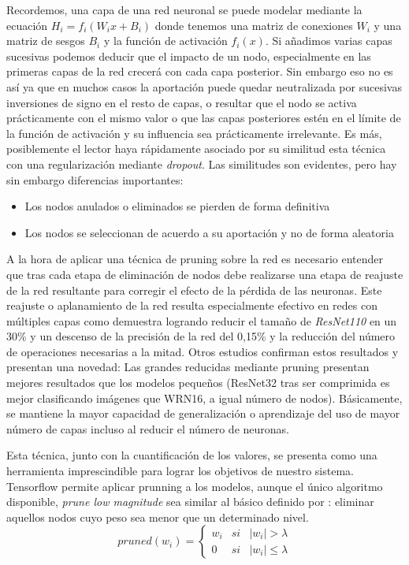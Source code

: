 Recordemos, una capa de una red neuronal se puede modelar mediante la ecuación $H_i = f_i(W_ix+B_i)$ donde tenemos una matriz de conexiones $W_{i}$ y una matriz de sesgos $B_{i}$ y la función de activación $f_i(x)$. Si añadimos varias capas sucesivas podemos deducir que el impacto de un nodo, especialmente en las primeras capas de la red crecerá con cada capa posterior. Sin embargo eso no es así ya que en muchos casos la aportación puede quedar neutralizada por sucesivas inversiones de signo en el resto de capas, o resultar que el nodo se activa prácticamente con el mismo valor o que las capas posteriores estén en el límite de la función de activación y su influencia sea prácticamente irrelevante\cite{Mozer1989}. Es más, posiblemente el lector haya rápidamente asociado por su similitud esta técnica con una regularización mediante \textit{dropout}. Las similitudes son evidentes, pero hay sin embargo diferencias importantes:
\begin{itemize}
  \item Los nodos anulados o eliminados se pierden de forma definitiva
  \item Los nodos se seleccionan de acuerdo a su aportación y no de forma aleatoria
\end{itemize}

A la hora de aplicar una técnica de pruning sobre la red es necesario entender que tras cada etapa de eliminación de nodos debe realizarse una etapa de reajuste de la red resultante para corregir el efecto de la pérdida de las neuronas. Este reajuste o aplanamiento de la red resulta especialmente efectivo en redes con múltiples capas como demuestra  logrando reducir el tamaño de \textit{ResNet110} en un 30\% y un descenso de la precisión de la red del 0,15\% y la reducción del número de operaciones necesarias a la mitad. Otros estudios\cite{Lee2019,Bartoldson2019,Han2015} confirman estos resultados y presentan una novedad: Las grandes reducidas mediante pruning presentan mejores resultados que los modelos pequeños (ResNet32 tras ser comprimida es mejor clasificando imágenes que WRN16, a igual número de nodos). Básicamente, se mantiene la mayor capacidad de generalización o aprendizaje del uso de mayor número de capas incluso al reducir el número de neuronas.

Esta técnica, junto con la cuantificación de los valores, se presenta como una herramienta imprescindible para lograr los objetivos de nuestro sistema. Tensorflow permite aplicar prunning a los modelos, aunque el único algoritmo disponible, \textit{prune low magnitude} sea similar al básico definido por : eliminar aquellos nodos cuyo peso sea menor que un determinado nivel.
\[
  pruned(w_{i})=\left\{
    \begin{array}{lcl}
      w_i & si & |w_i| > \lambda \\
      0 & si & |w_i|\leq  \lambda
    \end{array}
    \right.
\]

